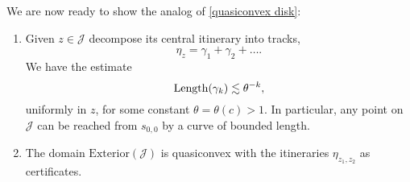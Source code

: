 We are now ready to show the analog of \cref{quasiconvex disk}:
\begin{theorem}  \leavevmode
\begin{enumerate}[label=\normalfont(\roman*)]

\item Given $z\in\mathcal{J}$ decompose its central itinerary into tracks, 
\begin{equation*}
\eta_z = \gamma _1 +\gamma_2 +\dots.
\end{equation*}
We have the estimate
\begin{equation*}
\operatorname{Length}(\gamma_{k})\lesssim\theta^{-k},
\end{equation*}
uniformly in $z$, for some constant $\theta=\theta(c)>1$. In particular, any point on \(\mathcal{J}\) can be reached from $s_{0,0}$ by a curve of bounded length.

\item The domain $\mathrm{Exterior}(\mathcal{J})$ is quasiconvex with the itineraries $\eta_{z_1,z_2}$ as certificates.
	\end{enumerate}
\end{theorem}

